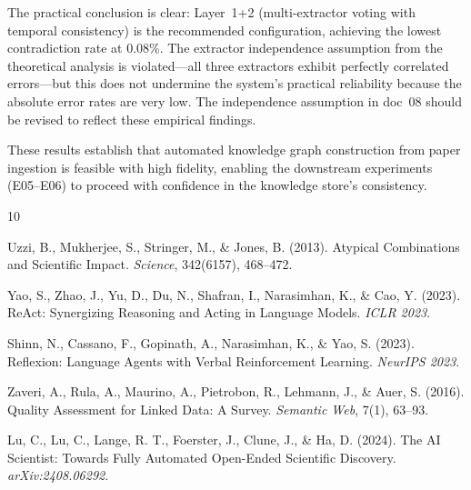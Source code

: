 \documentclass[11pt,a4paper]{article}
\begin{document}
The practical conclusion is clear: Layer~1+2 (multi-extractor voting with temporal consistency) is the recommended configuration, achieving the lowest contradiction rate at 0.08\%. The extractor independence assumption from the theoretical analysis is violated---all three extractors exhibit perfectly correlated errors---but this does not undermine the system's practical reliability because the absolute error rates are very low. The independence assumption in doc~08 should be revised to reflect these empirical findings.

These results establish that automated knowledge graph construction from paper ingestion is feasible with high fidelity, enabling the downstream experiments (E05--E06) to proceed with confidence in the knowledge store's consistency.


\begin{thebibliography}{10}

Uzzi, B., Mukherjee, S., Stringer, M., \& Jones, B. (2013).
Atypical Combinations and Scientific Impact.
\emph{Science}, 342(6157), 468--472.

Yao, S., Zhao, J., Yu, D., Du, N., Shafran, I., Narasimhan, K., \& Cao, Y. (2023).
ReAct: Synergizing Reasoning and Acting in Language Models.
\emph{ICLR 2023}.

Shinn, N., Cassano, F., Gopinath, A., Narasimhan, K., \& Yao, S. (2023).
Reflexion: Language Agents with Verbal Reinforcement Learning.
\emph{NeurIPS 2023}.

Zaveri, A., Rula, A., Maurino, A., Pietrobon, R., Lehmann, J., \& Auer, S. (2016).
Quality Assessment for Linked Data: A Survey.
\emph{Semantic Web}, 7(1), 63--93.

Lu, C., Lu, C., Lange, R. T., Foerster, J., Clune, J., \& Ha, D. (2024).
The AI Scientist: Towards Fully Automated Open-Ended Scientific Discovery.
\emph{arXiv:2408.06292}.

\end{thebibliography}
\end{document}
